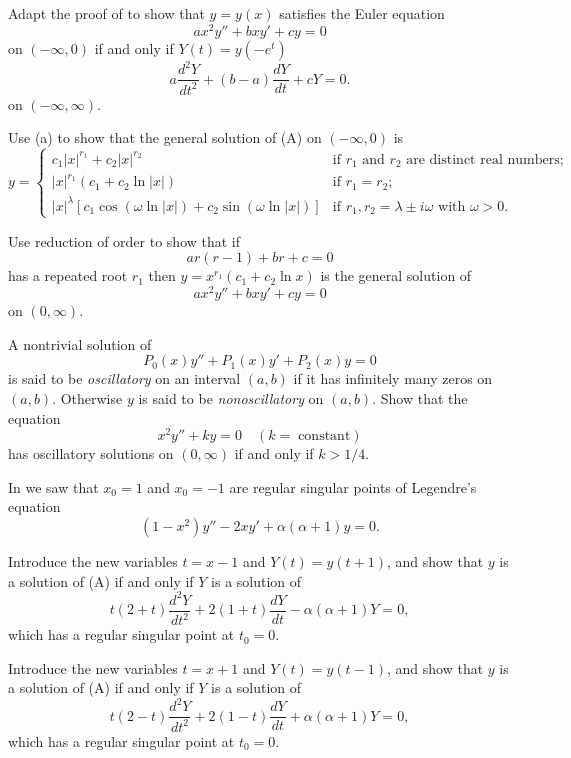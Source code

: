 \begin{exerciselist}
\item\label{exer:7.4.19}\begin{alist}
\item %
Adapt the proof of  to show that  $y=y(x)$
satisfies the Euler equation
\[ \tag{A}
ax^2y''+bxy'+cy=0
\]
on $(-\infty,0)$
if and only if  $Y(t)=y(-e^t)$
\[
a \frac{d^2Y}{dt^2}+(b-a)\frac{dY}{dt}+cY=0.
\]
on   $(-\infty,\infty)$.
\item %
Use (a)  to show that  the general solution of (A) on $(-\infty,0)$ is
\[
y=\begin{cases}
c_1|x|^{r_1}+c_2|x|^{r_2}&\text{if $r_1$ and $r_2$ are distinct
real numbers;} \\
|x|^{r_1}(c_1+c_2\ln|x|)&\text{if $r_1=r_2$;}\\
|x|^{\lambda}\left[c_1\cos\left(\omega\ln|x|\right)+
c_2\sin\left(\omega\ln|x| \right)\right]
&\text{if $r_1,r_2=\lambda\pm i\omega$ with $\omega>0$}.
\end{cases}
\]
\end{alist}

\item\label{exer:7.4.20}Use reduction of order to show that if
\[
ar(r-1)+br+c=0
\]
has a repeated root $r_1$ then $y=x^{r_1}(c_1+c_2\ln x)$ is the
general solution of
\[
ax^2y''+bxy'+cy=0
\]
on $(0,\infty)$.

\item\label{exer:7.4.21}A nontrivial solution of
\[
P_0(x)y''+P_1(x)y'+P_2(x)y=0
\]
is said to be
\emph{\color{blue}oscillatory}
on an
interval $(a,b)$ if it has infinitely many zeros on $(a,b)$.
Otherwise $y$ is said to be
\emph{\color{blue}nonoscillatory}
on $(a,b)$.
Show that the equation
\[
x^2y''+ky=0 \quad (k=\; \text{constant})
\]
has oscillatory solutions on $(0,\infty)$ if and only if $k>1/4$.

\item\label{exer:7.4.22}In  we saw  that $x_0=1$ and $x_0=-1$
are regular singular points of Legendre's equation
\[
(1-x^2)y''-2xy'+\alpha(\alpha+1)y=0.
\tag{A}
\]
\begin{alist}
\item %
Introduce the new variables $t=x-1$  and $Y(t)=y(t+1)$, and show that
$y$  is a solution of (A) if and only if
$Y$ is a solution of
\[
t(2+t)\frac{d^2Y}{dt^2}+2(1+t)\frac{dY}{dt}-\alpha(\alpha+1)Y=0,
\]
which has a regular singular point at $t_0=0$.
\item %
Introduce the new variables $t=x+1$  and $Y(t)=y(t-1)$, and show that
$y$  is a solution of (A) if and only if
$Y$ is a solution of
\[
t(2-t)\frac{d^2Y}{dt^2}+2(1-t)\frac{dY}{dt}+\alpha(\alpha+1)Y=0,
\]
which has a regular singular point at $t_0=0$.
\end{alist}


\end{exerciselist}
